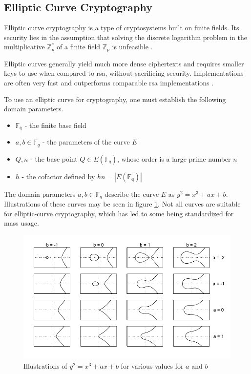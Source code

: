 \subsection{Elliptic Curve Cryptography}

Elliptic curve cryptography is a type of cryptosystems built on finite fields. Its security lies in the assumption that solving the discrete logarithm problem in the multiplicative $\mathbb{Z}_p^*$ of a finite field $\mathbb{Z}_p$ is unfeasible \cite{delfs2007}.

Elliptic curves generally yield much more dense ciphertexts and requires smaller keys to use when compared to \gls{rsa}, without sacrificing security. Implementations are often very fast and outperforms comparable \gls{rsa} implementations \cite{delfs2007}.

To use an elliptic curve for cryptography, one must establish the following domain parameters\cite{delfs2007}.

\begin{itemize}
    \item $\mathbb{F_q}$ - the finite base field
    \item $a,b\in\mathbb{F}_q$ - the parameters of the curve $E$
    \item $Q,n$ - the base point $Q\in E(\mathbb{F}_q)$, whose order is a large prime number $n$
    \item $h$ - the cofactor defined by $hn=|E(\mathbb{F_q})|$
\end{itemize}

The domain parameters $a,b\in\mathbb{F}_q$ describe the curve $E$ as $y^2=x^3+ax+b$. Illustrations of these curves may be seen in figure \ref{figure:background:elliptic-curves}. Not all curves are suitable for elliptic-curve cryptography, which has led to some being standardized for mass usage\cite{nist2018}.

\begin{figure}
    \centering
    \includegraphics{chapters/background/figures/elliptic-curves.pdf}
    \caption{Illustrations of $y^2=x^3+ax+b$ for various values for $a$ and $b$}
    \label{figure:background:elliptic-curves}
\end{figure}


